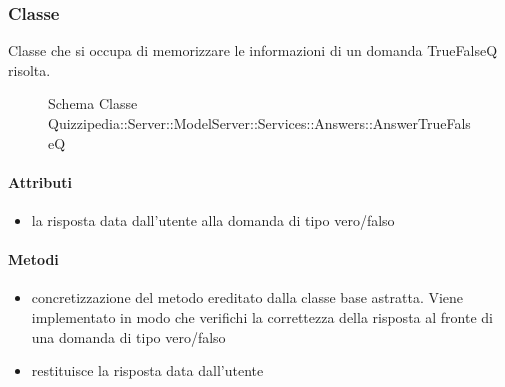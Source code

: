 \subsubsection{Classe }
Classe che si occupa di memorizzare le informazioni di un domanda TrueFalseQ risolta.
\begin{figure}[H]
\centering
\noindent{}
\caption[Schema Classe AnswerTrueFalseQ]{Schema Classe Quizzipedia::Server::ModelServer::Services::Answers::AnswerTrueFalseQ}
\end{figure}
\paragraph{Attributi}
\begin{itemize}
\item {}
\newline
la risposta data dall'utente alla domanda di tipo vero/falso
\end{itemize}
\paragraph{Metodi}
\begin{itemize}
\item {}
\newline
concretizzazione del metodo ereditato dalla classe base astratta. Viene implementato in modo che verifichi la correttezza della risposta al fronte di una domanda di tipo vero/falso
\newline
\item {}
\newline
restituisce la risposta data dall'utente
\newline
\end{itemize}
